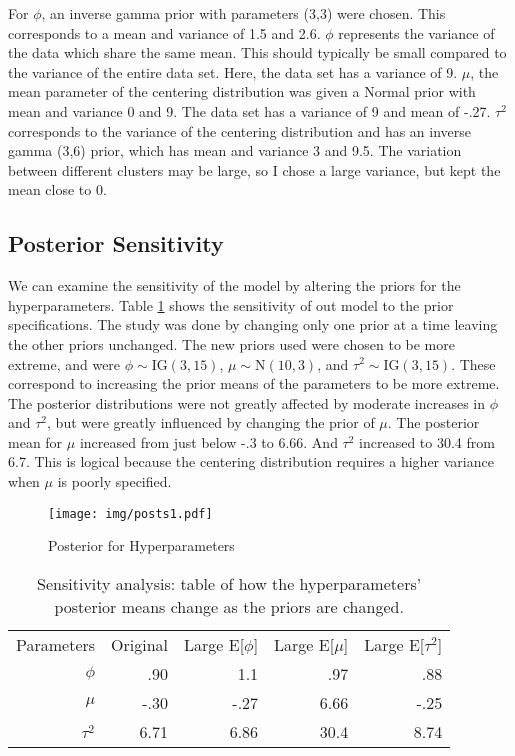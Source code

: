 \documentclass{article}
\def\beginmyfig{\begin{figure}[h]\begin{center}}
\def\endmyfig{\end{center}\end{figure}}
\begin{document}
\noindent
For $\phi$, an inverse gamma prior with parameters (3,3) were chosen. This
corresponds to a mean and variance of 1.5 and 2.6. $\phi$ represents the
variance of the data which share the same mean. This should typically be small
compared to the variance of the entire data set. Here, the data set has a
variance of 9. $\mu$, the mean parameter of the centering distribution was
given a Normal prior with mean and variance 0 and 9.  The data set has a
variance of 9 and mean of -.27.  $\tau^2$ corresponds to the variance of the
centering distribution and has an inverse gamma (3,6) prior, which has
mean and variance 3 and 9.5. The variation between different clusters
may be large, so I chose a large variance, but kept the mean close to 0.\\


\subsection{Posterior Sensitivity}
We can examine the sensitivity of the model by altering the priors for the
hyperparameters. Table \ref{tab:posts1} shows the sensitivity of out model to
the prior specifications. The study was done by changing only one prior at a
time leaving the other priors unchanged. The new priors used were chosen to be
more extreme, and were $\phi \sim \text{IG}(3,15)$, $\mu \sim \text{N}(10,3)$,
and $\tau^2 \sim \text{IG}(3,15)$. These correspond to increasing the prior
means of the parameters to be more extreme. The posterior distributions were
not greatly affected by moderate increases in $\phi$ and $\tau^2$, but were
greatly influenced by changing the prior of $\mu$. The posterior mean for $\mu$
increased from just below -.3 to 6.66. And $\tau^2$ increased to 30.4 from 6.7.
This is logical because the centering distribution requires a higher variance 
when $\mu$ is poorly specified.

\beginmyfig
  \texttt{[image: img/posts1.pdf]}
  \caption{Posterior for Hyperparameters}
  \label{fig:post1}
\endmyfig

\begin{table}[h]
  \center
  \begin{tabular}{r|rrrr}
    Parameters & Original & Large E[$\phi$]& Large E[$\mu$] & Large E[$\tau^2$] \\
    $\phi$   &  .90 & 1.1  &   .97 &  .88 \\
    $\mu$    & -.30 & -.27 &  6.66 & -.25 \\
    $\tau^2$ & 6.71 & 6.86 & 30.4  & 8.74 \\
  \end{tabular}
  \caption{Sensitivity analysis: table of how the hyperparameters' posterior
  means change as the priors are changed.}
  \label{tab:posts1}
\end{table}
\end{document}
